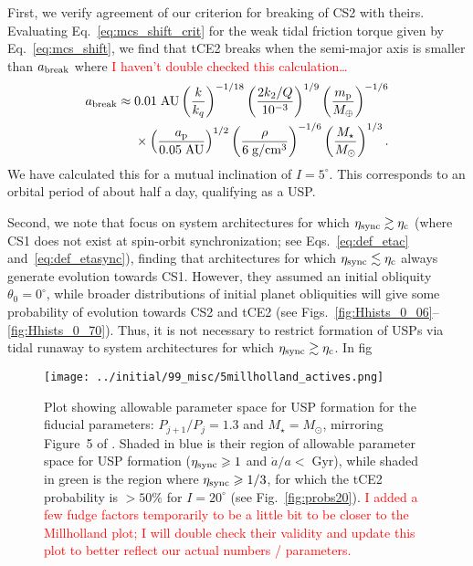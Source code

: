 \documentclass[
        fleqn,
        usenatbib,
    ]{mnras}
\newcommand*{\p}[1]{\left(#1\right)}
\begin{document}
First, we verify agreement of our criterion for breaking of CS2 with theirs.
Evaluating Eq.~\eqref{eq:mcs_shift_crit} for the weak tidal friction torque
given by Eq.~\eqref{eq:mcs_shift}, we find that tCE2 breaks when the semi-major
axis is smaller than $a_{\rm break}$ where \textcolor{red}{I haven't double
checked this calculation\dots}
\begin{align}
    a_{\rm break}
        \approx{}& 0.01\;\mathrm{AU}
            \p{\frac{k}{k_q}}^{-1/18}
            \p{\frac{2 k_2 / Q}{10^{-3}}}^{1/9}
            \p{\frac{m_{\rm p}}{M_{\rm \oplus}}}^{-1/6}\nonumber\\
            &\times \p{\frac{a_{\rm p}}{0.05\;\mathrm{AU}}}^{1/2}
            \p{\frac{\rho}{6\;\mathrm{g/cm^3}}}^{-1/6}
            \p{\frac{M_{\star}}{M_{\odot}}}^{1/3}.
\end{align}
We have calculated this for a mutual inclination of $I = 5^\circ$. This
corresponds to an orbital period of about half a day, qualifying as a USP\@.

Second, we note that \citet{millholland2020formation} focus on system
architectures for which $\eta_{\rm sync} \gtrsim \eta_{\rm c}$ (where CS1 does
not exist at spin-orbit synchronization; see Eqs.~\ref{eq:def_etac}
and~\ref{eq:def_etasync}), finding that architectures for which $\eta_{\rm sync}
\lesssim \eta_{\rm c}$ always generate evolution towards CS1. However, they
assumed an initial obliquity $\theta_{0} = 0^\circ$, while broader distributions
of initial planet obliquities will give some probability of evolution towards
CS2 and tCE2 (see Figs.~\ref{fig:Hhists_0_06}--\ref{fig:Hhists_0_70}). Thus, it
is not necessary to restrict formation of USPs via tidal runaway to system
architectures for which $\eta_{\rm sync} \gtrsim \eta_{\rm c}$. In fig
\begin{figure}
    \centering
    \texttt{[image: ../initial/99\_misc/5millholland\_actives.png]}
    \caption{Plot showing allowable parameter space for USP formation for the
    fiducial parameters: $P_{j + 1} / P_j = 1.3$ and $M_\star = M_{\odot}$,
    mirroring Figure~5 of \citet{millholland2020formation}. Shaded in blue is
    their region of allowable parameter space for USP formation ($\eta_{\rm
    sync} \geq 1$ and $\dot{a} / a < \;\mathrm{Gyr}$), while shaded in
    green is the region where $\eta_{\rm sync} \geq 1/3$, for which the tCE2
    probability is $> 50\%$ for $I = 20^\circ$ (see Fig.~\ref{fig:probs20}).
    \textcolor{red}{I added a few fudge factors temporarily to be a little bit
    to be closer to the Millholland plot; I will double check their validity and
    update this plot to better reflect our actual numbers / parameters.}
    }\label{fig:millholland_actives}
\end{figure}
\end{document}
